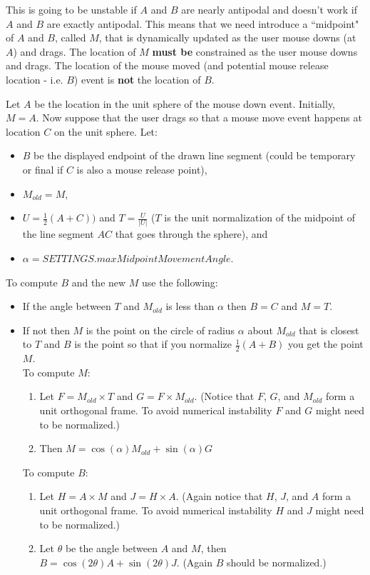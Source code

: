 \documentclass{article}
\begin{document}
This is going to be unstable if $A$ and $B$ are nearly antipodal and doesn't work if $A$ and $B$
are exactly antipodal.  This means that we need introduce a ``midpoint" of $A$ and $B$, called $M$,
that is dynamically updated as the user mouse downs (at $A$) and drags. The location of  $M$ \textbf{must be} constrained as the user mouse downs and drags. The location of the mouse moved (and potential mouse release location - i.e. $B$) event is \textbf{not} the location of $B$.

Let $A$ be the location in the unit sphere of the mouse down event. Initially, $M = A$. Now suppose that the user drags so that a mouse move event happens at location $C$ on the unit sphere. Let:
\begin{itemize}
    \item $B$ be the displayed endpoint of the drawn line segment (could be temporary or final if $C$ is also a mouse release point),
    \item $M_{old} = M$,
    \item $U = \frac{1}{2}(A+C))$ and $T= \frac{U}{|U|}$ ($T$ is the unit normalization of the midpoint of the line segment $AC$ that goes through the sphere), and
    \item  $\alpha = SETTINGS.maxMidpointMovementAngle$.
\end{itemize}
To compute $B$ and the new $M$ use the following:
\begin{itemize}
    \item If the angle between $T$ and $M_{old}$ is less than $\alpha$ then $B = C$ and $M = T$.
    \item If not then $M$ is the point on the circle of radius $\alpha$ about $M_{old}$ that is closest to $T$ and $B$ is the point so that if you normalize $\frac{1}{2} (A+B)$ you get the point $M$.\\ To compute $M$:
          \begin{enumerate}
              \item Let $F = M_{old} \times T$ and $G= F \times M_{old}$. (Notice that $F$, $G$, and $M_{old}$ form a unit orthogonal frame. To avoid numerical instability $F$ and $G$ might need to be normalized.)
              \item Then $M = \cos(\alpha)M_{old} + \sin(\alpha)G$
          \end{enumerate}
          To compute $B$:
          \begin{enumerate}
              \item Let $H= A \times M$ and $J = H \times A$. (Again notice that $H$, $J$, and $A$ form a unit orthogonal frame. To avoid numerical instability $H$ and $J$ might need to be normalized.)
              \item Let $\theta$ be the angle between $A$ and $M$, then $B = \cos(2\theta)A + \sin(2\theta)J$. (Again $B$ should be normalized.)
          \end{enumerate}
\end{itemize}
\end{document}
